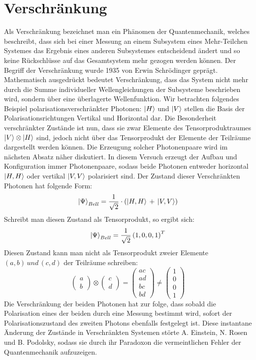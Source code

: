 \documentclass[twoside,colorback,accentcolor=tud4c,11pt]{tudreport}
\begin{document}
\section{Verschränkung}
Als Verschränkung bezeichnet man ein Phänomen der Quantenmechanik, welches beschreibt, dass sich bei einer Messung an einem Subsystem eines Mehr-Teilchen Systemes das Ergebnis eines anderen Subsystemes entscheidend ändert und so keine Rückschlüsse auf das Gesamtsystem mehr gezogen werden können. Der Begriff der Verschränkung wurde 1935 von Erwin Schrödinger geprägt. Mathematisch ausgedrückt bedeutet Verschränkung, dass das System nicht mehr durch die Summe individueller Wellengleichungen der Subsysteme beschrieben wird, sondern über eine überlagerte Wellenfunktion.
Wir betrachten folgendes Beispiel polarisationsverschränkter Photonen:
$\Ket{H}$ und $\Ket{V}$ stellen die Basis der Polarisationsrichtungen Vertikal und Horizontal dar. Die Besonderheit verschränkter Zustände ist nun, dass sie zwar Elemente des Tensorproduktraumes $\Ket{V}\otimes\Ket{H}$ sind, jedoch nicht über das Tensorprodukt der Elemente der Teilräume dargestellt werden können.
Die Erzeugung solcher Photonenpaare wird im nächsten Absatz näher diskutiert. In diesem Versuch erzeugt der Aufbau und Konfiguration immer Photonenpaare, sodass beide Photonen entweder horizontal $\Ket{H,H}$ oder vertikal $\Ket{V,V}$ polarisiert sind. Der Zustand dieser Verschränkten Photonen hat folgende Form:
\begin{equation}
\Ket{\Psi}_{Bell}=\frac{1}{\sqrt{2}}\cdot\left(\Ket{H,H}\,+\,\Ket{V,V}\right)
\end{equation}
Schreibt man diesen Zustand als Tensorprodukt, so ergibt sich:
\begin{equation}
\Ket{\Psi}_{Bell}=\frac{1}{\sqrt{2}}\left(1,0,0,1\right)^{T}
\end{equation}
Diesen Zustand kann man nicht als Tensorprodukt zweier Elemente $\left(a,b\right)\,und\,\left(c,d\right)$ der Teilräume schreiben:
\begin{equation}
\left(\begin{array}{c}a\\b\end{array}\right)\otimes\left(\begin{array}{c}c\\d\end{array}\right)=\left(\begin{array}{c}ac\\ad\\bc\\bd\end{array}\right)\neq\left(\begin{array}{c}1\\0\\0\\1\end{array}\right)
\end{equation}
Die Verschränkung der beiden Photonen hat zur folge, dass sobald die Polarisation eines der beiden durch eine Messung bestimmt wird, sofort der Polarisationszustand des zweiten Photons ebenfalls festgelegt ist.
Diese instantane Änderung der Zustände in Verschränkten Systemen störte A. Einstein, N. Rosen und B. Podolsky, sodass sie durch ihr Paradoxon die vermeintlichen Fehler der Quantenmechanik aufzuzeigen.
\end{document}
